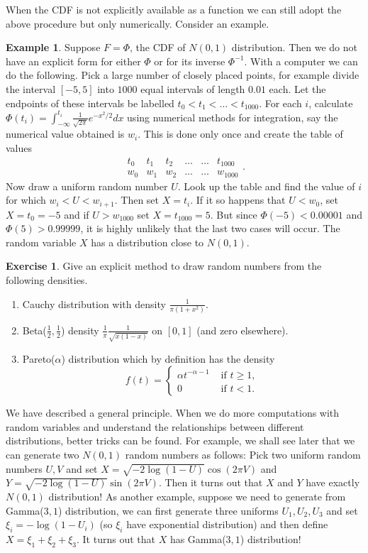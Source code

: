 \documentclass[preprint,  11pt]{amsart}
\theoremstyle{plain} %
\theoremstyle{definition} %
\newtheorem{exercise}[theorem]{Exercise}
\newtheorem{example}[theorem]{Example}
\begin{document}
When the CDF is not explicitly available as a function we can still adopt the above procedure but only numerically. Consider an example.
\begin{example} Suppose $F=\Phi$, the CDF of $N(0,1)$ distribution. Then we do not have an explicit form for either $\Phi$ or for its inverse $\Phi^{-1}$. With a computer we can do the following. Pick a large number of closely placed points, for example divide the interval $[-5,5]$ into $1000$ equal intervals of length $0.01$ each. Let the endpoints of these intervals be labelled $t_{0}<t_{1}<\ldots <t_{1000}$. For each $i$, calculate $\Phi(t_{i})=\int_{-\infty}^{t_{i}}\frac{1}{\sqrt{2\pi}}e^{-x^{2}/2}dx$ using numerical methods for integration, say the numerical value obtained is $w_{i}$. This is done only once and create the table of values 
$$
\begin{array}{cccccc}
t_{0} & t_{1} & t_{2} & \ldots & \ldots & t_{1000} \\
w_{0} & w_{1} & w_{2} & \ldots & \ldots & w_{1000}
\end{array}.
$$
Now draw a uniform random number $U$. Look up the table and find the value of $i$ for which $w_{i}<U<w_{i+1}$. Then set $X=t_{i}$. If it so happens that $U<w_{0}$, set $X=t_{0}=-5$ and if $U>w_{1000}$ set $X=t_{1000}=5$. But since $\Phi(-5)<0.00001$ and $\Phi(5)>0.99999$, it is highly unlikely that the last two cases will occur. The random variable $X$ has a distribution close to $N(0,1)$.
\end{example}

\begin{exercise} Give an explicit method to draw random numbers from the following densities.
\begin{enumerate}\setlength\itemsep{6pt}
\item Cauchy distribution with density $\frac{1}{\pi(1+x^{2})}$.
\item Beta($\frac{1}{2},\frac{1}{2}$) density $\frac{1}{\pi}\frac{1}{\sqrt{x(1-x)}}$ on $[0,1]$ (and zero elsewhere). 
\item Pareto($\alpha$) distribution which by definition has the density $$f(t)=\begin{cases} \alpha t^{-\alpha-1} & \mbox{ if }t\ge 1, \\ 0 & \mbox{ if }t<1. \end{cases}$$ 
\end{enumerate}
\end{exercise}


We have described a general principle. When we do more computations with random variables and understand the relationships between different distributions, better tricks can be found.  For example, we shall see later that we can generate two $N(0,1)$ random numbers as follows: Pick two uniform random numbers $U,V$ and set $X=\sqrt{-2\log(1-U)}\cos(2\pi V)$ and $Y=\sqrt{-2\log(1-U)}\sin(2\pi V)$. Then it turns out that $X$ and $Y$ have exactly $N(0,1)$ distribution! As another example, suppose we need to generate from Gamma($3,1$) distribution, we can first generate three uniforms $U_{1},U_{2},U_{3}$ and set $\xi_{i}=-\log(1-U_{i})$ (so $\xi_{i}$ have exponential distribution) and then define $X=\xi_{1}+\xi_{2}+\xi_{3}$. It turns out that $X$ has Gamma($3,1$) distribution!
\end{document}
